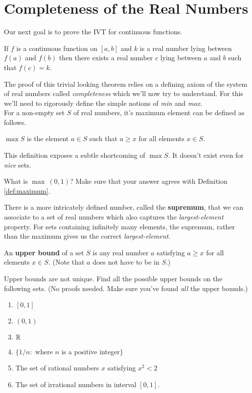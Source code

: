 
\section{Completeness of the Real Numbers}
Our next goal is to prove the IVT for continuous functions.

\begin{theorem}
	If $f$ is a continuous function on $[a,b]$ and $k$ is a real number lying between $f(a)$ and $f(b)$ then there exists a real number $ c $ lying between $a$ and $b$ such that $f(c) = k$.
\end{theorem}

The proof of this trivial looking theorem relies on a defining axiom of the system of real numbers called {\it completeness} which we'll now try to understand. For this we'll need to rigorously define the simple notions of {\it min} and {\it max}.\\


For a non-empty set $S$ of real numbers, it's maximum element can be defined as follows.
\begin{definition}
	\label{def:maximum}
	$\max S$ is the element $a \in S$ such that $a \ge x$ for all elements $x \in S$.
\end{definition}
This definition exposes a subtle shortcoming of $\max S$. It doesn't exist even for {\it nice} sets.
\begin{exercise}
	What is $\max \: (0,1)$? Make sure that your answer agrees with Definition \ref{def:maximum}.
\end{exercise}

There is a more intricately defined number, called the {\bf supremum}, that we can associate to a set of real numbers which also captures the {\it largest-element} property. For sets containing infinitely many elements, the supremum, rather than the maximum gives us the correct {\it largest-element}.

\begin{definition}
	An {\bf upper bound} of a set $S$ is any real number $a$ satisfying $a \ge x$ for all elements $x \in S$. (Note that $a$ does not have to be in $S$.)
\end{definition}

\begin{exercise}
	\label{q:upper_bounds}
	Upper bounds are not unique. Find all the possible upper bounds on the following sets. (No proofs needed. Make sure you've found {\it all} the upper bounds.)
	\begin{enumerate}
		\item $[0,1]$
		\item $(0,1)$
		\item $\mathbb{R}$
		\item $\{ 1/n :$ where $n$ is a positive integer$\}$
		\item The set of rational numbers $x$ satisfying $x^2 < 2$
		\item The set of irrational numbers in interval $[0,1]$.
	\end{enumerate}
\end{exercise}

